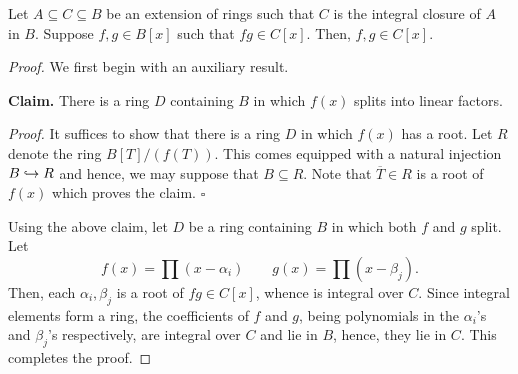 \begin{lemma}
    Let $A\subseteq C\subseteq B$ be an extension of rings such that $C$ is the integral closure of $A$ in $B$. Suppose $f,g\in B[x]$ such that $fg\in C[x]$. Then, $f,g\in C[x]$.
\end{lemma}
\begin{proof}
    We first begin with an auxiliary result. 

    \noindent\textbf{Claim.} There is a ring $D$ containing $B$ in which $f(x)$ splits into linear factors. 

    \noindent\textit{Proof.} It suffices to show that there is a ring $D$ in which $f(x)$ has a root. Let $R$ denote the ring $B[T]/(f(T))$. This comes equipped with a natural injection $B\hookrightarrow R$ and hence, we may suppose that $B\subseteq R$. Note that $\overline T\in R$ is a root of $f(x)$ which proves the claim. $\square$

    Using the above claim, let $D$ be a ring containing $B$ in which both $f$ and $g$ split. Let 
    \begin{equation*}
        f(x) = \prod(x - \alpha_i) \qquad g(x) = \prod(x - \beta_j).
    \end{equation*}
    Then, each $\alpha_i,\beta_j$ is a root of $fg\in C[x]$, whence is integral over $C$. Since integral elements form a ring, the coefficients of $f$ and $g$, being polynomials in the $\alpha_i$'s and $\beta_j$'s respectively, are integral over $C$ and lie in $B$, hence, they lie in $C$. This completes the proof.
\end{proof}

